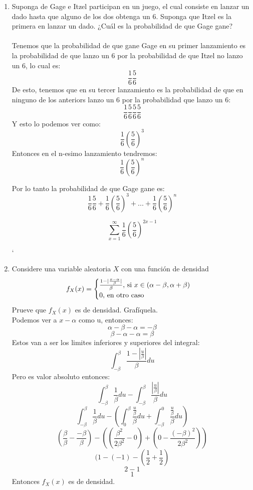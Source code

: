 \documentclass[12pt,a4paper]{report}
\begin{document}
	\begin{enumerate}
		\item{
			Suponga de Gage e Itzel participan en un juego, el cual consiste en
			lanzar un dado hasta que alguno de los dos obtenga un 6. Suponga
			que Itzel es la primera en lanzar un dado. ¿Cuál es la probabilidad
			de que Gage gane?
			\\ \\
	        Tenemos que la probabilidad de que gane Gage en su primer lanzamiento es la 
		probabilidad de que lanzo un 6 por la probabilidad de que Itzel no lanzo un 
		6, lo cual es:
	        \[\frac{1}{6}\frac{5}{6}\]
	        De esto, tenemos que en su tercer lanzamiento es la probabilidad de que en 
		ninguno de los anteriors lanzo un 	6 por la probabilidad que lanzo  un 6:		
	        \[\frac{1}{6}\frac{5}{6}\frac{5}{6}\frac{5}{6}\]
	        Y esto lo podemos ver como:
	        \[\frac{1}{6}(\frac{5}{6})^{3}\]
	        Entonces en el n-esimo lanzamiento tendremos:
	        \[\frac{1}{6}(\frac{5}{6})^{n}\]
	        
	        Por lo tanto la probabilidad de que Gage gane es:
	        \[\frac{1}{6}\frac{5}{6} + \frac{1}{6}(\frac{5}{6})^{3} + ... + \frac{1}{6}(\frac{5}{6})^{n}\]
	        
	        \[\sum^{\infty}_{x=1} \frac{1}{6}(\frac{5}{6})^{2x - 1}\]
	        
	        
	       `
			
		}
		\item{
			Considere una variable aleatoria $X$ con una función de densidad
			\[
				f_X(x) = \begin{cases}
					\frac{1-|\frac{x-\alpha}{\beta}|}{\beta},
					$ si $ x \in (\alpha - \beta, \alpha + \beta)\\
					0, $ en otro caso$
				\end{cases}
			\]
			Prueve que $f_X(x)$ es de densidad. Grafíquela.\\
			
			Podemos ver a $x - \alpha$ como u, entonces:
			\[\alpha - \beta - \alpha = -\beta\]
			\[\beta - \alpha - \alpha = \beta\]
			Estos van a ser los limites inferiores y superiores del integral:
    			\[\int^\beta_{-\beta}  \frac{1-|\frac{u}{\beta}|}{\beta}du\]
			Pero es valor absoluto entonces:
			\[\int^\beta_{-\beta} \frac{1}{\beta}du - \int^\beta_{-\beta} \frac{|\frac{u}{\beta}|}{\beta}du\]
			\[\int^\beta_{-\beta} \frac{1}{\beta}du -( \int^\beta_{0} \frac{\frac{u}{\beta}}{\beta}du + 				\int^0_{-\beta}  \frac{\frac{u}{\beta}}{\beta}du)\]
			\[(\frac{\beta}{\beta}-\frac{-\beta}{\beta}) - ((\frac{\beta^2}{2\beta^2} - 0) 
			+ (0 - \frac{(-\beta)^2}{2\beta^2}))\]
			\[(1-(-1) - (\frac{1}{2} + \frac{1}{2})\]
			\[2-1\]
			\[1\]
			Entonces $f_X(x)$ es de densidad.
		}


\end{enumerate}
\end{document}
